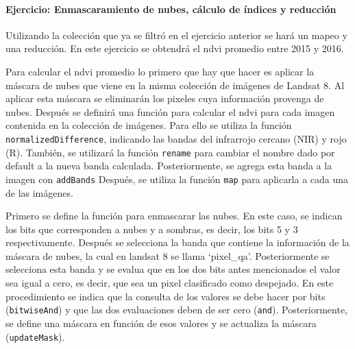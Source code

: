 \documentclass[
]{article}
\begin{document}
\hypertarget{ejercicio-enmascaramiento-de-nubes-cuxe1lculo-de-uxedndices-y-reducciuxf3n}{%
\paragraph{Ejercicio: Enmascaramiento de nubes, cálculo de índices y
reducción}\label{ejercicio-enmascaramiento-de-nubes-cuxe1lculo-de-uxedndices-y-reducciuxf3n}}

Utilizando la colección que ya se filtró en el ejercicio anterior se
hará un mapeo y una reducción. En este ejercicio se obtendrá el ndvi
promedio entre 2015 y 2016.

Para calcular el ndvi promedio lo primero que hay que hacer es aplicar
la máscara de nubes que viene en la misma colección de imágenes de
Landsat 8. Al aplicar esta máscara se eliminarán los pixeles cuya
información provenga de nubes. Después se definirá una función para
calcular el ndvi para cada imagen contenida en la colección de imágenes.
Para ello se utiliza la función \texttt{normalizedDifference}, indicando
las bandas del infrarrojo cercano (NIR) y rojo (R). También, se
utilizará la función \texttt{rename} para cambiar el nombre dado por
default a la nueva banda calculada. Posteriormente, se agrega esta banda
a la imagen con \texttt{addBands} Después, se utiliza la función
\texttt{map} para aplicarla a cada una de las imágenes.

Primero se define la función para enmascarar las nubes. En este caso, se
indican los bits que corresponden a nubes y a sombras, es decir, los
bits 5 y 3 respectivamente. Después se selecciona la banda que contiene
la información de la máscara de nubes, la cual en landsat 8 se llama
`pixel\_qa'. Posteriormente se selecciona esta banda y se evalua que en
los dos bits antes mencionados el valor sea igual a cero, es decir, que
sea un pixel clasificado como despejado. En este procedimiento se indica
que la consulta de los valores se debe hacer por bits
(\texttt{bitwiseAnd}) y que las dos evaluaciones deben de ser cero
(\texttt{and}). Posteriormente, se define una máscara en función de esos
valores y se actualiza la máscara (\texttt{updateMask}).
\end{document}
